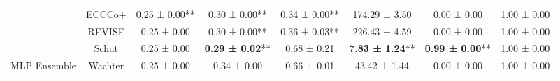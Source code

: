 \begin{table}
{\begin{tabular}[t]{cccccccc}
 & ECCCo+ & 0.25 ± 0.00** & 0.30 ± 0.00** & 0.34 ± 0.00** & 174.29 ± 3.50\hphantom{*}\hphantom{*} & 0.00 ± 0.00\hphantom{*}\hphantom{*} & 1.00 ± 0.00\hphantom{*}\hphantom{*}\\

 & REVISE & 0.25 ± 0.00\hphantom{*}\hphantom{*} & 0.30 ± 0.00** & 0.36 ± 0.03** & 226.43 ± 4.59\hphantom{*}\hphantom{*} & 0.00 ± 0.00\hphantom{*}\hphantom{*} & 1.00 ± 0.00\hphantom{*}\hphantom{*}\\

 & Schut & 0.25 ± 0.00\hphantom{*}\hphantom{*} & \textbf{0.29 ± 0.02}** & 0.68 ± 0.21\hphantom{*}\hphantom{*} & \textbf{7.83 ± 1.24}** & \textbf{0.99 ± 0.00}** & 1.00 ± 0.00\hphantom{*}\hphantom{*}\\

\multirow[t]{-6}{*}{\centering\arraybackslash MLP Ensemble} & Wachter & 0.25 ± 0.00\hphantom{*}\hphantom{*} & 0.34 ± 0.00\hphantom{*}\hphantom{*} & 0.66 ± 0.01\hphantom{*}\hphantom{*} & 43.42 ± 1.44\hphantom{*}\hphantom{*} & 0.00 ± 0.00\hphantom{*}\hphantom{*} & 1.00 ± 0.00\hphantom{*}\hphantom{*}\\
\bottomrule
\end{tabular}}
\end{table}
